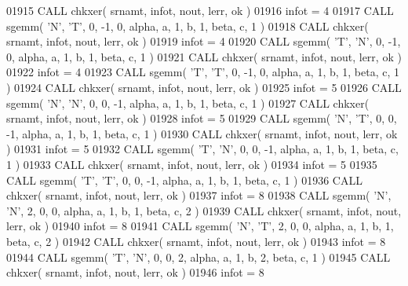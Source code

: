 \begin{DoxyCode}
01915       \textcolor{keyword}{CALL }chkxer( srnamt, infot, nout, lerr, ok )
01916       infot = 4
01917       \textcolor{keyword}{CALL }sgemm( \textcolor{stringliteral}{'N'}, \textcolor{stringliteral}{'T'}, 0, -1, 0, alpha, a, 1, b, 1, beta, c, 1 )
01918       \textcolor{keyword}{CALL }chkxer( srnamt, infot, nout, lerr, ok )
01919       infot = 4
01920       \textcolor{keyword}{CALL }sgemm( \textcolor{stringliteral}{'T'}, \textcolor{stringliteral}{'N'}, 0, -1, 0, alpha, a, 1, b, 1, beta, c, 1 )
01921       \textcolor{keyword}{CALL }chkxer( srnamt, infot, nout, lerr, ok )
01922       infot = 4
01923       \textcolor{keyword}{CALL }sgemm( \textcolor{stringliteral}{'T'}, \textcolor{stringliteral}{'T'}, 0, -1, 0, alpha, a, 1, b, 1, beta, c, 1 )
01924       \textcolor{keyword}{CALL }chkxer( srnamt, infot, nout, lerr, ok )
01925       infot = 5
01926       \textcolor{keyword}{CALL }sgemm( \textcolor{stringliteral}{'N'}, \textcolor{stringliteral}{'N'}, 0, 0, -1, alpha, a, 1, b, 1, beta, c, 1 )
01927       \textcolor{keyword}{CALL }chkxer( srnamt, infot, nout, lerr, ok )
01928       infot = 5
01929       \textcolor{keyword}{CALL }sgemm( \textcolor{stringliteral}{'N'}, \textcolor{stringliteral}{'T'}, 0, 0, -1, alpha, a, 1, b, 1, beta, c, 1 )
01930       \textcolor{keyword}{CALL }chkxer( srnamt, infot, nout, lerr, ok )
01931       infot = 5
01932       \textcolor{keyword}{CALL }sgemm( \textcolor{stringliteral}{'T'}, \textcolor{stringliteral}{'N'}, 0, 0, -1, alpha, a, 1, b, 1, beta, c, 1 )
01933       \textcolor{keyword}{CALL }chkxer( srnamt, infot, nout, lerr, ok )
01934       infot = 5
01935       \textcolor{keyword}{CALL }sgemm( \textcolor{stringliteral}{'T'}, \textcolor{stringliteral}{'T'}, 0, 0, -1, alpha, a, 1, b, 1, beta, c, 1 )
01936       \textcolor{keyword}{CALL }chkxer( srnamt, infot, nout, lerr, ok )
01937       infot = 8
01938       \textcolor{keyword}{CALL }sgemm( \textcolor{stringliteral}{'N'}, \textcolor{stringliteral}{'N'}, 2, 0, 0, alpha, a, 1, b, 1, beta, c, 2 )
01939       \textcolor{keyword}{CALL }chkxer( srnamt, infot, nout, lerr, ok )
01940       infot = 8
01941       \textcolor{keyword}{CALL }sgemm( \textcolor{stringliteral}{'N'}, \textcolor{stringliteral}{'T'}, 2, 0, 0, alpha, a, 1, b, 1, beta, c, 2 )
01942       \textcolor{keyword}{CALL }chkxer( srnamt, infot, nout, lerr, ok )
01943       infot = 8
01944       \textcolor{keyword}{CALL }sgemm( \textcolor{stringliteral}{'T'}, \textcolor{stringliteral}{'N'}, 0, 0, 2, alpha, a, 1, b, 2, beta, c, 1 )
01945       \textcolor{keyword}{CALL }chkxer( srnamt, infot, nout, lerr, ok )
01946       infot = 8

\end{DoxyCode}
